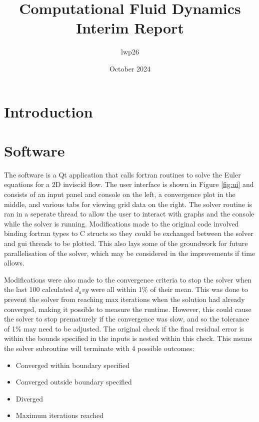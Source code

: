 \documentclass{article}
\begin{document}
\title{Computational Fluid Dynamics \\
    \large Interim Report}
\author{lwp26}
\date{October 2024}
\maketitle 

\section{Introduction}

\section{Software}

The software is a Qt application that calls fortran routines to solve the Euler equations for a 2D inviscid flow.
The user interface is shown in Figure \ref{fig:ui} and consists of an input panel and console on the left,
a convergence plot in the middle, and various tabs for viewing grid data on the right.
The solver routine is ran in a seperate thread to allow the user to interact with graphs and the console while the solver is running.
Modifications made to the original code involved binding fortran types to C structs so they could be exchanged between the solver and gui threads to be plotted.
This also lays some of the groundwork for future parallelisation of the solver, which may be considered in the improvements if time allows.

Modifications were also made to the convergence criteria to stop the solver when the last 100 calculated $d_avg$ were all within 1\% of their mean.
This was done to prevent the solver from reaching max iterations when the solution had already converged, making it possible to measure the runtime.
However, this could cause the solver to stop prematurely if the convergence was slow, and so the tolerance of 1\% may need to be adjusted.
The original check if the final residual error is within the bounds specified in the inputs is nested within this check.
This means the solver subroutine will terminate with 4 possible outcomes:
\begin{itemize}
    \item Converged within boundary specified
    \item Converged outside boundary specified
    \item Diverged
    \item Maximum iterations reached
\end{itemize}
\end{document}
